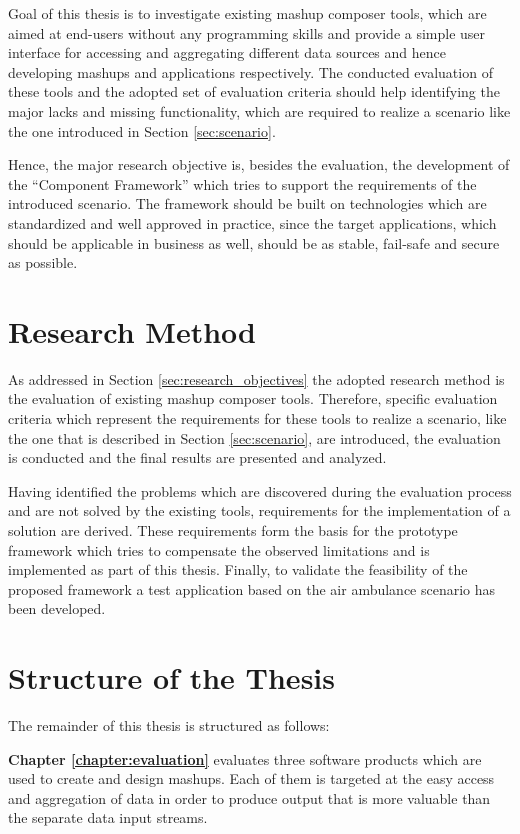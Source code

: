 Goal of this thesis is to investigate existing mashup composer tools, which are aimed at end-users
without any programming skills and provide a simple user interface for accessing and aggregating
different data sources and hence developing mashups and applications respectively. The conducted
evaluation of these tools and the adopted set of evaluation criteria should help identifying the
major lacks and missing functionality, which are required to realize a scenario like the one
introduced in Section \ref{sec:scenario}.

Hence, the major research objective is, besides the evaluation, the development of the
``Component Framework'' which tries to support the requirements of the introduced scenario. The
framework should be built on technologies which are standardized and well approved in practice,
since the target applications, which should be applicable in business as well, should be as stable,
fail-safe and secure as possible.

\section{Research Method}

As addressed in Section \ref{sec:research_objectives} the adopted research method is the evaluation
of existing mashup composer tools. Therefore, specific evaluation criteria which represent the
requirements for these tools to realize a scenario, like the one that is described in Section
\ref{sec:scenario}, are introduced, the evaluation is conducted and the final results are presented
and analyzed.

Having identified the problems which are discovered during the evaluation process and are not
solved by the existing tools, requirements for the implementation of a solution are derived.
These requirements form the basis for the prototype framework which tries to compensate the observed
limitations and is implemented as part of this thesis. Finally, to validate the feasibility of the
proposed framework a test application based on the air ambulance scenario has been developed.

\section{Structure of the Thesis}
The remainder of this thesis is structured as follows:

\textbf{Chapter \ref{chapter:evaluation}} evaluates three software products which are used to create and
design mashups. Each of them is targeted at the easy access and aggregation of data in order to
produce output that is more valuable than the separate data input streams.

